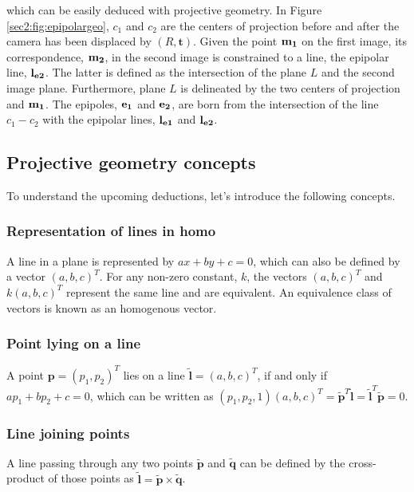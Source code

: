 which can be easily deduced with projective geometry. In Figure \ref{sec2:fig:epipolargeo}, $c_1$ and $c_2$ are the centers of projection before and after the camera has been displaced by $(R, \mathbf{t})$. Given the point $\bf m_1$ on the first image, its correspondence, $\bf m_2$, in the second image is constrained to a line, the epipolar line, $\bf l_{e2}$. The latter is defined as the intersection of the plane $L$ and the second image plane. Furthermore, plane $L$ is delineated by the two centers of projection and $\bf m_1$. The epipoles, $\bf e_1$ and $\bf e_2$, are born from the intersection of the line $c_1 - c_2$ with the epipolar lines, $\bf l_{e1}$ and $\bf l_{e2}$. 

\subsection{Projective geometry concepts}

To understand the upcoming deductions, let's introduce the following concepts.
\subsubsection{Representation of lines in \gls{homo}}
A line in a plane is represented by $a x + b y + c = 0$, which can also be defined by a vector $( a , b , c ) ^T$. For any non-zero constant, $k$, the vectors  $( a , b , c ) ^T$ and $k(a , b , c ) ^T$ represent the same line and are equivalent. An equivalence class of vectors is known as an homogenous vector. 
\subsubsection{Point lying on a line}
A point $\mathbf { p } = ( p_1 , p_2 ) ^ T$ lies on a line $\mathbf {\tilde{l}} = ( a , b , c ) ^ { T }$, if and only if $a p_1 + b p_2 + c = 0$, which can be written as $( p_1 , p_2 , 1 ) ( a , b , c ) ^T = \mathbf { \tilde{p} } ^T \mathbf {\tilde{l}} = \mathbf {\tilde{l}} ^T \mathbf { \tilde{p} } = 0$.
\subsubsection{Line joining points}
A line passing through any two points $\mathbf{\tilde{p}}$ and $\mathbf{\tilde{q}}$ can be defined by the cross-product of those points as $\mathbf{\tilde{l}} = \mathbf{\tilde{p}} \times \mathbf{\tilde{q}}$.
